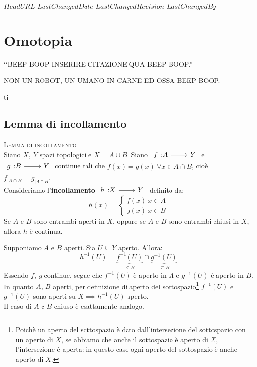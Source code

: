 \svnidlong
{$HeadURL$}
{$LastChangedDate$}
{$LastChangedRevision$}
{$LastChangedBy$}

\chapter{Omotopia}

\begin{introduction}
	‘‘BEEP BOOP INSERIRE CITAZIONE QUA BEEP BOOP.''
	\begin{flushright}
		\textsc{NON UN ROBOT,} UN UMANO IN CARNE ED OSSA BEEP BOOP.
	\end{flushright}ti
\end{introduction}

\section{Lemma di incollamento}
\begin{lemming}\textsc{Lemma di incollamento}\label{lemmaincollamento}\\
	Siano $X,\ Y$ spazi topologici e $X=A\cup B$. Siano $\funz{f}{A}{Y}$ e $\funz{g}{B}{Y}$ continue tali che $f\left(x\right)=g\left(x\right)\ \forall x\in A\cap B$, cioè $f_{\mid A\cap B}=g_{\mid A\cap B}$.\\
	Consideriamo l'\textbf{incollamento} $\funz{h}{X}{Y}$ definito da:
	\begin{equation}
		h\left(x\right)=\begin{cases}
			f\left(x\right)\ x\in A\\
			g\left(x\right)\ x\in B
		\end{cases}
	\end{equation}
	Se $A$ e $B$ sono entrambi aperti in $X$, oppure se $A$ e $B$ sono entrambi chiusi in $X$, allora $h$ è continua.
\end{lemming}
\begin{demonstration}
	Supponiamo $A$ e $B$ aperti. Sia $U\subseteq Y$ aperto. Allora:
	\begin{equation*}
		h^{-1}\left(U\right)=\underbrace{f^{-1}\left(U\right)}_{\subseteq B}\cap \underbrace{g^{-1}\left(U\right)}_{\subseteq B}
	\end{equation*}
Essendo $f,\ g$ continue, segue che $f^{-1}\left(U\right)$ è aperto in $A$ e $g^{-1}\left(U\right)$ è aperto in $B$.\\
In quanto $A,\ B$ aperti, per definizione di aperto del sottospazio\footnote{Poichè un aperto del sottospazio è dato dall'intersezione del sottospazio con un aperto di $X$, se abbiamo che anche il sottospazio è aperto di $X$, l'intersezione è aperta: in questo caso ogni aperto del sottospazio è anche aperto di $X$.} $f^{-1}\left(U\right)$ e $g^{-1}\left(U\right)$ sono aperti su $X\implies h^{-1}\left(U\right)$ aperto.\\
Il caso di $A$ e $B$ chiuso è esattamente analogo. 
\end{demonstration}

